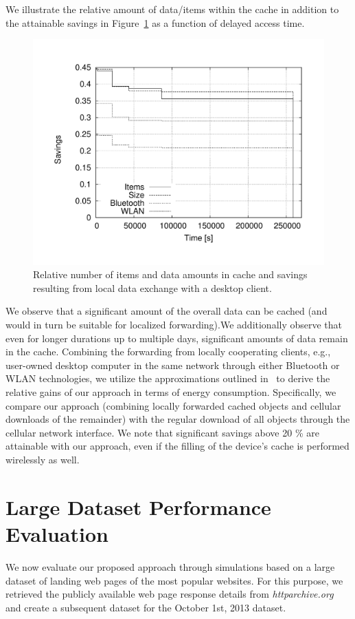 \documentclass[letterpaper,conference]{IEEEtran}
\begin{document}
We illustrate the relative amount of data/items within the cache in addition to the attainable savings in Figure~\ref{fig:rel_ios_time} as a function of delayed access time. 
\begin{figure}
	\centering
	\includegraphics[width=.925\linewidth]{rel_ios_time}
	\caption{Relative number of items and data amounts in cache and savings resulting from local data exchange with a desktop client.}
	\label{fig:rel_ios_time}
\end{figure}
We observe that a significant amount of the overall data can be cached (and would in turn be suitable for localized forwarding).We additionally observe that even for longer durations up to multiple days, significant amounts of data remain in the cache.
Combining the forwarding from locally cooperating clients, e.g., user-owned desktop computer in the same network through either Bluetooth or WLAN technologies, we utilize the approximations outlined in~\cite{Se13} to derive the relative gains of our approach in terms of energy consumption. 
Specifically, we compare our approach (combining locally forwarded cached objects and cellular downloads of the remainder) with the regular download of all objects through the cellular network interface. 
We note that significant savings above 20 \% are attainable with our approach, even if the filling of the device's cache is performed wirelessly as well.



\section{Large Dataset Performance Evaluation}
\label{s:large}
We now evaluate our proposed approach through simulations based on a large dataset of landing web pages of the most popular websites.
For this purpose, we retrieved the publicly available web page response details from \emph{httparchive.org} and create a subsequent dataset for the October 1st, 2013 dataset.
\end{document}
